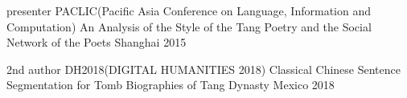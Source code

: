 



\begin{cvhonors}

  \cvhonor
    {presenter} %
    {PACLIC(Pacific Asia Conference on Language, Information and
    Computation) An Analysis of the Style of the Tang Poetry and the Social Network of the Poets} %
    {Shanghai} %
    {2015} %

  \cvhonor
    {2nd author} %
    {DH2018(DIGITAL HUMANITIES 2018) Classical Chinese Sentence Segmentation for Tomb Biographies of Tang Dynasty} %
    {Mexico} %
    {2018} %

\end{cvhonors}
